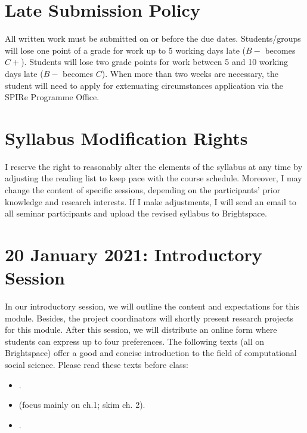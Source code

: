 \documentclass[abstract=on,parskip=full,headings=standardclasses,fontsize=11pt,paper=a4]{scrartcl}
\begin{document}
\section*{Late Submission Policy}

All written work must be submitted on or before the due dates. Students/groups will lose one point of a grade for work up to 5 working days late ($B-$ becomes $C+$). Students will lose two grade points for work between 5 and 10 working days late ($B-$ becomes $C$). When more than two weeks are necessary, the student will need to apply for extenuating circumstances application via the SPIRe Programme Office.



\section*{Syllabus Modification Rights}

I reserve the right to reasonably alter the elements of the syllabus at any time by adjusting the reading list to keep pace with the course schedule. Moreover, I may change the content of specific sessions, depending on the participants' prior knowledge and research interests. If I make adjustments, I will send an email to all seminar participants and upload the revised syllabus to Brightspace.




\tableofcontents

\section{20 January 2021: Introductory Session} \label{introsession}

In our introductory session, we will outline the content and expectations for this module. Besides, the project coordinators will shortly present  research projects for this module. After this session, we will distribute an online form where students can express up to four preferences. The following texts (all on Brightspace) offer a good and concise introduction to the field of computational social science. Please read these texts before class:


\begin{itemize}
\item {}. 
\item {} (focus mainly on ch.1; skim ch. 2).
\item {}.
\end{itemize}
\end{document}

